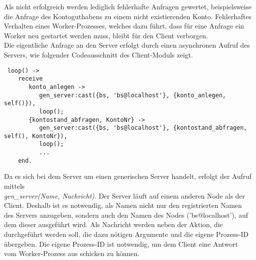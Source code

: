 Als nicht erfolgreich werden lediglich fehlerhafte Anfragen gewertet, beispielsweise die Anfrage des Kontoguthabens zu einem nicht existierenden Konto. Fehlerhaftes Verhalten eines Worker-Prozesses, welches dazu führt, dass für eine Anfrage ein Worker neu gestartet werden muss, bleibt für den Client verborgen.\\
Die eigentliche Anfrage an den Server erfolgt durch einen asynchronen Aufruf des Servers, wie folgender Codeausschnitt des Client-Moduls zeigt.
\begin{lstlisting} 
 loop() ->
    receive
       konto_anlegen ->
          gen_server:cast({bs, 'bs@localhost'}, {konto_anlegen, self()}),
          loop();
       {kontostand_abfragen, KontoNr} ->
          gen_server:cast({bs, 'bs@localhost'}, {kontostand_abfragen, self(), KontoNr}),
          loop();
	   	  ...
    end.
\end{lstlisting}
Da es sich bei dem Server um einen generischen Server handelt, erfolgt der Aufruf mittels \\ \textit{gen\_server(Name, Nachricht)}. Der Server läuft auf einem anderen Node als der Client. Deshalb ist es notwendig, als Namen nicht nur den registrierten Namen des Servers anzugeben, sondern auch den Namen des Nodes ('bs@localhost'), auf dem dieser ausgeführt wird. Als Nachricht werden neben der Aktion, die durchgeführt werden soll, die dazu nötigen Argumente und die eigene Prozess-ID übergeben. Die eigene Prozess-ID ist notwendig, um dem Client eine Antwort vom Worker-Prozess aus schicken zu können.